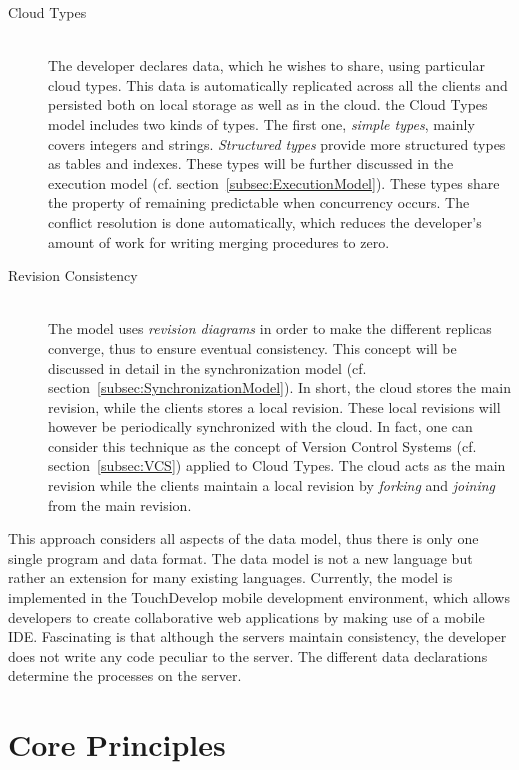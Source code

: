 \documentclass[a4paper,12pt]{report}
\begin{document}
\begin{description}
    \item[Cloud Types] \hfill \\The developer declares data, which he wishes to share, using particular cloud types. This data is automatically replicated across all the clients and persisted both on local storage as well as in the cloud. the Cloud Types model includes two kinds of types. The first one, \textit{simple types}, mainly covers integers and strings. \textit{Structured types} provide more structured types as tables and indexes. These types will be further discussed in the execution model (cf. section~\ref{subsec:ExecutionModel}). These types share the property of remaining predictable when concurrency occurs. The conflict resolution is done automatically, which reduces the developer's amount of work for writing merging procedures to zero.
    \item[Revision Consistency] \hfill \\ The model uses \textit{revision diagrams} in order to make the different replicas converge, thus to ensure eventual consistency. This concept will be discussed in detail in the synchronization model (cf. section~\ref{subsec:SynchronizationModel}). In short, the cloud stores the main revision, while the clients stores a local revision. These local revisions will however be periodically synchronized with the cloud. In fact, one can consider this technique as the concept of Version Control Systems (cf. section~\ref{subsec:VCS}) applied to Cloud Types. The cloud acts as the main revision while the clients maintain a local revision by \textit{forking} and \textit{joining} from the main revision.
\end{description} 

This approach considers all aspects of the data model, thus there is only one single program and data format. The data model is not a new language but rather an extension for many existing languages. Currently, the model is implemented in the TouchDevelop mobile development environment, which allows developers to create collaborative web applications by making use of a mobile IDE. Fascinating is that although the servers maintain consistency, the developer does not write any code peculiar to the server. The different data declarations determine the processes on the server. 

\section{Core Principles}\label{sec:CorePrinciples}
\end{document}
